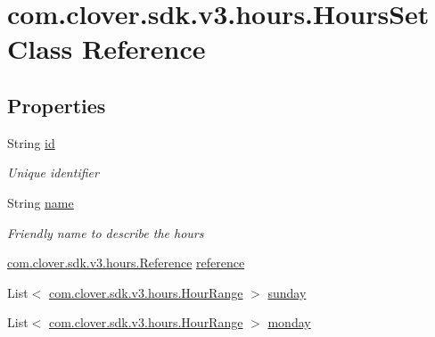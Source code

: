 \hypertarget{classcom_1_1clover_1_1sdk_1_1v3_1_1hours_1_1_hours_set}{}\section{com.\+clover.\+sdk.\+v3.\+hours.\+Hours\+Set Class Reference}
\label{classcom_1_1clover_1_1sdk_1_1v3_1_1hours_1_1_hours_set}
\subsection*{Properties}
\begin{DoxyCompactItemize}
\item 
String \hyperlink{classcom_1_1clover_1_1sdk_1_1v3_1_1hours_1_1_hours_set_ab5aa2ec031611b6befad44ebeb54e7ba}{id}
\begin{DoxyCompactList}\small\item\em Unique identifier \end{DoxyCompactList}\item 
String \hyperlink{classcom_1_1clover_1_1sdk_1_1v3_1_1hours_1_1_hours_set_a34262033dbac199a247904b789abae38}{name}
\begin{DoxyCompactList}\small\item\em Friendly name to describe the hours \end{DoxyCompactList}\item 
\hyperlink{classcom_1_1clover_1_1sdk_1_1v3_1_1hours_1_1_reference}{com.\+clover.\+sdk.\+v3.\+hours.\+Reference} \hyperlink{classcom_1_1clover_1_1sdk_1_1v3_1_1hours_1_1_hours_set_a9e0a2bf36cadec3d8ee9dd7e9328b1eb}{reference}
\item 
List$<$ \hyperlink{classcom_1_1clover_1_1sdk_1_1v3_1_1hours_1_1_hour_range}{com.\+clover.\+sdk.\+v3.\+hours.\+Hour\+Range} $>$ \hyperlink{classcom_1_1clover_1_1sdk_1_1v3_1_1hours_1_1_hours_set_a591c5cd08ac6bc3fcd6b5e8d45d233d8}{sunday}
\item 
List$<$ \hyperlink{classcom_1_1clover_1_1sdk_1_1v3_1_1hours_1_1_hour_range}{com.\+clover.\+sdk.\+v3.\+hours.\+Hour\+Range} $>$ \hyperlink{classcom_1_1clover_1_1sdk_1_1v3_1_1hours_1_1_hours_set_a1ca4338e3da333d5dc8bee364e04007f}{monday}

\end{DoxyCompactItemize}
